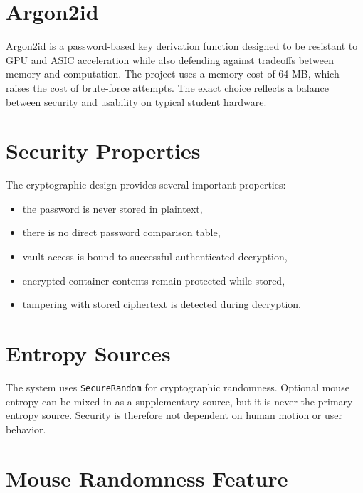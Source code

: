 \section{Argon2id}
Argon2id  \cite{argon2} is a password-based key derivation function designed to be resistant to GPU and ASIC acceleration while also defending against tradeoffs between memory and computation. The project uses a memory cost of 64 MB, which raises the cost of brute-force attempts. The exact choice reflects a balance between security and usability on typical student hardware.

\section{Security Properties}
The cryptographic design provides several important properties:
\begin{itemize}
  \item the password is never stored in plaintext,
  \item there is no direct password comparison table,
  \item vault access is bound to successful authenticated decryption,
  \item encrypted container contents remain protected while stored,
  \item tampering with stored ciphertext is detected during decryption.
\end{itemize}

\section{Entropy Sources}
The system uses \texttt{SecureRandom}  for cryptographic randomness. Optional mouse entropy can be mixed in as a supplementary source, but it is never the primary entropy source. Security is therefore not dependent on human motion or user behavior.

\section{Mouse Randomness Feature}

